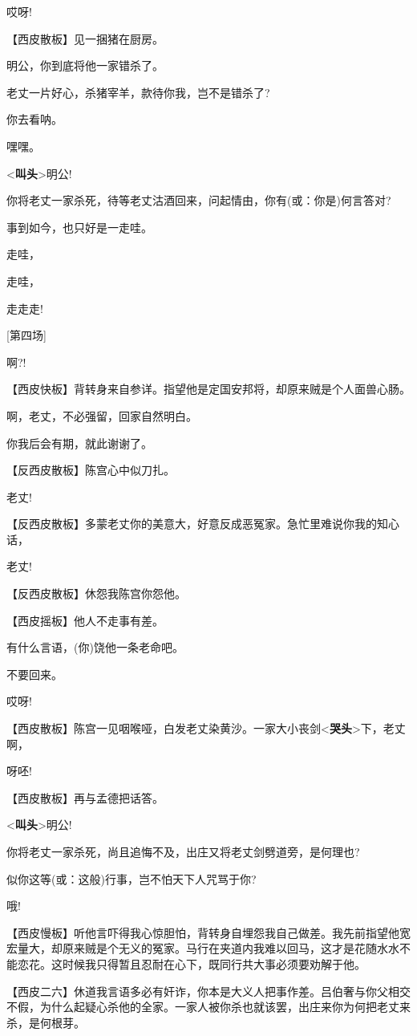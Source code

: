 哎呀!

【西皮散板】见一捆猪在厨房。

明公，你到底将他一家错杀了。

老丈一片好心，杀猪宰羊，款待你我，岂不是错杀了?

你去看呐。

嘿嘿。

\textless{}\textbf{叫头}\textgreater{}明公!

你将老丈一家杀死，待等老丈沽酒回来，问起情由，你有(或：你是)何言答对?

事到如今，也只好是一走哇。

走哇，

走哇，

走走走!

{[}第四场{]}

啊?!

【西皮快板】背转身来自参详。指望他是定国安邦将，却原来贼是个人面兽心肠。

啊，老丈，不必强留，回家自然明白。

你我后会有期，就此谢谢了。

【反西皮散板】陈宫心中似刀扎。

老丈!

【反西皮散板】多蒙老丈你的美意大，好意反成恶冤家。急忙里难说你我的知心话，

老丈!

【反西皮散板】休怨我陈宫你怨他。

【西皮摇板】他人不走事有差。

有什么言语，(你)饶他一条老命吧。

不要回来。

哎呀!

【西皮散板】陈宫一见咽喉哑，白发老丈染黄沙。一家大小丧剑\textless{}\textbf{哭头}\textgreater{}下，老丈啊，

呀呸!

【西皮散板】再与孟德把话答。

\textless{}\textbf{叫头}\textgreater{}明公!

你将老丈一家杀死，尚且追悔不及，出庄又将老丈剑劈道旁，是何理也?

似你这等(或：这般)行事，岂不怕天下人咒骂于你?

哦!

【西皮慢板】听他言吓得我心惊胆怕，背转身自埋怨我自己做差。我先前指望他宽宏量大，却原来贼是个无义的冤家。马行在夹道内我难以回马，这才是花随水水不能恋花。这时候我只得暂且忍耐在心下，既同行共大事必须要劝解于他。

【西皮二六】休道我言语多必有奸诈，你本是大义人把事作差。吕伯奢与你父相交不假，为什么起疑心杀他的全家。一家人被你杀也就该罢，出庄来你为何把老丈来杀，是何根芽。

